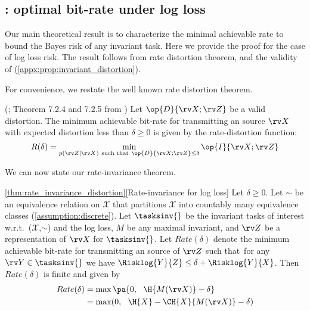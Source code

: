 \documentclass[final]{article}
\begin{document}
\subsection{\texorpdfstring{}{Theorem 2}: optimal bit-rate under log loss}
\label{appx:theorem_logloss}

Our main theoretical result is to characterize the minimal achievable rate to bound the Bayes risk of any invariant task.
Here we provide the proof for the case of log loss risk.
The result follows from  rate distortion theorem, and the validity of \disttextinv{}  (\cref{appx:prop:invariant_distortion}).

For convenience, we restate the well known rate distortion theorem. 

\begin{lemma}(\citet{shannon_coding_1959}; Theorem 7.2.4 and 7.2.5 from \citet{berger_rate_1971})\label{lemma:rate_distortion}
Let $\op{D}{\rv X; \rv Z}$ be a valid distortion. 
The minimum achievable
bit-rate for transmitting an \iid source $\rv X$ with expected distortion less than $\delta \geq 0$ is given by the rate-distortion function:
\begin{equation}\label{appx:eq:rate_distortion}
R(\delta) =  \min_{p(\rv Z| \rv X) \ \text{such that} \ \op{D}{\rv X; \rv Z} \leq \delta}   \op{I}{\rv X; \rv Z} 
\end{equation}
\end{lemma}

We can now state our rate-invariance theorem.

\begin{manualthm}{\ref{thm:rate_invariance_distortion}}[Rate-invariance for log loss]
Let $\delta \geq 0$.
Let $\sim$ be an equivalence relation on $\mathcal{X}$ that partitions $\mathcal{X}$ into countably many equivalence classes (\cref{assumption:discrete}).
Let $\tasksinv{}$ be the invariant tasks of interest w.r.t.\  ($\mathcal{X}$,$\sim$) and the log loss, $M$ be any maximal invariant, and $\rv Z$ be a representation of $\rv X$ for $\tasksinv{}$.
Let $Rate(\delta)$ denote the minimum achievable bit-rate for transmitting an \iid source of $\rv Z$ such that\ for any $\rv Y \in \tasksinv{}$ we have $\Risklog{Y}{Z} \leq \delta + \Risklog{Y}{X}$.
Then $Rate(\delta)$  is finite and given by
\begin{align}
Rate(\delta) &=  \max \pa{0, \ \ \H{M(\rv X)} - \delta} \label{eq:appx:rate_invariance_distortion:HMX} \\
&= \max(0, \ \ \H{X} - \CH{ X}{M(\rv X)} - \delta) \label{eq:appx:rate_invariance_distortion:HX}
\end{align}
\end{manualthm}
\end{document}
